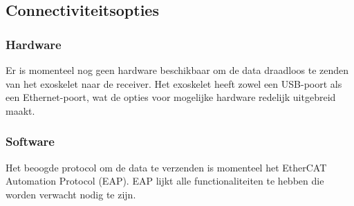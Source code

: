 \subsection{Connectiviteitsopties}
\subsubsection{Hardware}
Er is momenteel nog geen hardware beschikbaar om de data draadloos te zenden van het exoskelet naar de receiver. Het exoskelet heeft zowel een USB-poort als een Ethernet-poort, wat de opties voor mogelijke hardware redelijk uitgebreid maakt.
\subsubsection{Software}
Het beoogde protocol om de data te verzenden is momenteel het EtherCAT Automation Protocol (EAP). EAP lijkt alle functionaliteiten te hebben die worden verwacht nodig te zijn. 